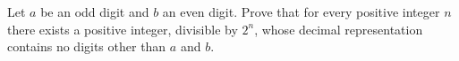 Let $a$ be an odd digit and $b$ an even digit. Prove that for every positive integer $n$ there exists a positive integer, divisible by $2^n$,  whose decimal representation contains no digits other than $a$ and $b$.